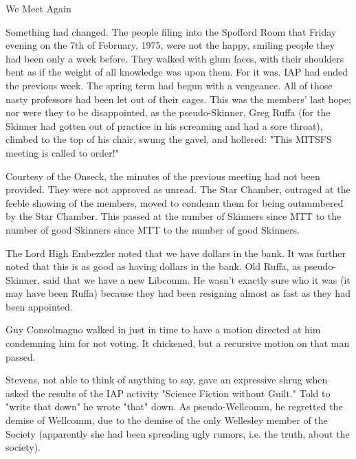 \documentclass[12pt]{article}
\begin{document}
\begin{center}

We Meet Again

\end{center}
 
\vspace{12pt}

\setlength{\parskip}{6pt}

\noindent
Something had changed. The people filing into the Spofford Room that Friday evening on the 7th of February, 1975, were not the happy, smiling people they had been only a week before. They walked with glum faces, with their shoulders bent as if the weight of all knowledge was upon them. For it was. IAP had ended the previous week. The spring term had begun with a vengeance. All of those nasty professors had been let out of their cages. This was the members' last hope; nor were they to be disappointed, as the pseudo-Skinner, Greg Ruffa (for the Skinner had gotten out of practice in his screaming and had a sore throat), climbed to the top of his chair, swung the gavel, and hollered: "This MITSFS meeting is called to order!"

Courtesy of the Onseck, the minutes of the previous meeting had not been provided. They were not approved as unread. The Star Chamber, outraged at the feeble showing of the members, moved to condemn them for being outnumbered by the Star Chamber. This passed at the number of Skinners since MTT to the number of good Skinners since MTT to the number of good Skinners.

The Lord High Embezzler noted that we have dollars in the bank. It was further noted that this is as good as having dollars in the bank. Old Ruffa, as pseudo-Skinner, said that we have a new Libcomm. He wasn't exactly sure who it was (it may have been Ruffa) because they had been resigning almost as fast as they had been appointed.

Guy Consolmagno walked in just in time to have a motion directed at him condemning him for not voting. It chickened, but a recursive motion on that man passed.

Stevens, not able to think of anything to say, gave an expressive shrug when asked the results of the IAP activity "Science Fiction without Guilt." Told to "write that down" he wrote "that" down. As pseudo-Wellcomm, he regretted the demise of Wellcomm, due to the demise of the only Wellesley member of the Society (apparently she had been spreading ugly rumors, i.e. the truth, about the society).
\end{document}
